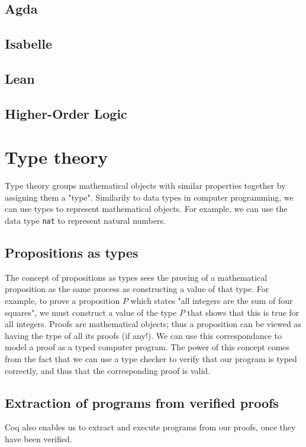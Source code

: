 \subsection{Agda}

\subsection{Isabelle}

\subsection{Lean}

\subsection{Higher-Order Logic}

\section{Type theory}

Type theory groups mathematical objects with similar properties together by assigning them a "type".
Similarily to data types in computer programming, we can use types to represent mathematical
objects. For example, we can use the data type \texttt{nat} to represent natural numbers.

\subsection{Propositions as types}
The concept of propositions as types sees the proving of a mathematical proposition
as the same process as constructing a value of that type.
For example, to prove a proposition $P$ which states "all integers are the sum of four squares",
we must construct a value of the type $P$ that shows that this is true for all integers.
Proofs are mathematical objects; thus a proposition can be viewed as having the type of all its proofs (if any!).
We can use this correspondance to model a proof as a typed computer program.
The power of this concept comes from the fact that we can use a type checker to verify that
our program is typed correctly, and thus that the corresponding proof is valid.

\subsection{Extraction of programs from verified proofs}

Coq also enables us to extract and execute programs from our proofs, once they have been verified.
